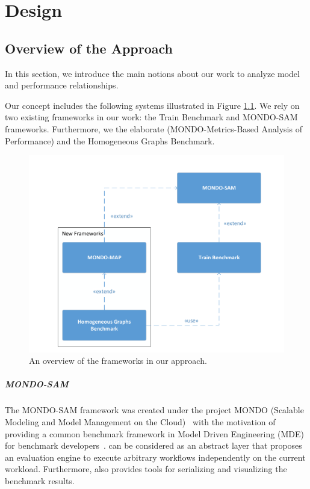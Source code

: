 \chapter{Design}

\section{Overview of the Approach}

In this section, we introduce the main notions about our work to analyze model and performance relationships.

Our concept includes the following systems illustrated in Figure \ref{fig:frameworks}. We rely on two existing frameworks in our work: the Train Benchmark and MONDO-SAM frameworks. Furthermore, we the elaborate \framework (MONDO-Metrics-Based Analysis of Performance) and the Homogeneous Graphs Benchmark.
\begin{figure}[!ht]
	\centering
	\includegraphics[width=130mm, keepaspectratio]{figures/frameworks.pdf}
	\caption{An overview of the frameworks in our approach.}
	\label{fig:frameworks}
\end{figure}

\paragraph{MONDO-SAM}
The MONDO-SAM framework was created under the project MONDO (Scalable Modeling and Model Management on the Cloud)~\cite{mondo} with the motivation of providing a common benchmark framework in Model Driven Engineering (MDE) for benchmark developers~\cite{mondo-sam}. \sam can be considered as an abstract layer that proposes an evaluation engine to execute arbitrary workflows independently on the current workload. Furthermore, \sam also provides tools for serializing and visualizing the benchmark results.

